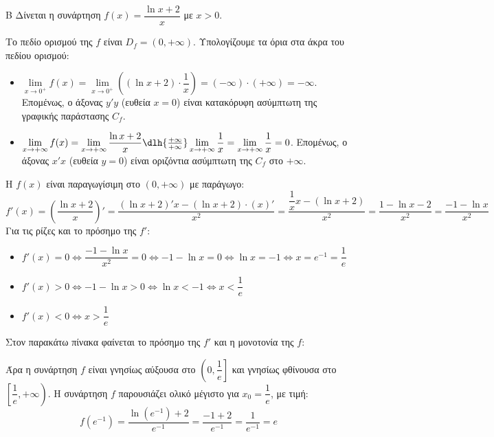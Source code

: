 \begin{thema}{Β}
Δίνεται η συνάρτηση $f(x) = \dfrac{\ln x + 2}{x}$ με $x > 0$.

\begin{erwthma}
\item Το πεδίο ορισμού της $f$ είναι $D_f = (0, +\infty)$.
Υπολογίζουμε τα όρια στα άκρα του πεδίου ορισμού:
\begin{itemize}
\item $\lim\limits_{x\to0^+} f(x) = \lim\limits_{x\to0^+} \left( (\ln x + 2) \cdot \dfrac{1}{x} \right) = (-\infty) \cdot (+\infty) = -\infty$.
  Επομένως, ο άξονας $y'y$ (ευθεία $x=0$) είναι κατακόρυφη ασύμπτωτη της γραφικής παράστασης $C_f$.
\item $\lim\limits_{x\to+\infty} f(x) = \lim\limits_{x\to+\infty} \dfrac{\ln x + 2}{x} \dlh{\frac{+\infty}{+\infty}} \lim\limits_{x\to+\infty} \dfrac{1}{x} = \lim\limits_{x\to+\infty} \dfrac{1}{x} = 0$.
Επομένως, ο άξονας $x'x$ (ευθεία $y=0$) είναι οριζόντια ασύμπτωτη της $C_f$ στο $+\infty$.
\end{itemize}


\item Η $f(x)$ είναι παραγωγίσιμη στο $(0, +\infty)$ με παράγωγο:
\[ f'(x) = \left( \dfrac{\ln x + 2}{x} \right)' = \dfrac{(\ln x + 2)' x - (\ln x + 2) \cdot (x)'}{x^2} = \dfrac{\dfrac{1}{x}x - (\ln x + 2)}{x^2} = \dfrac{1 - \ln x - 2}{x^2} = \dfrac{-1 - \ln x}{x^2} \]
Για τις ρίζες και το πρόσημο της $f'$:
\begin{itemize}
    \item $f'(x) = 0 \Leftrightarrow \dfrac{-1-\ln x}{x^2} = 0 \Leftrightarrow -1-\ln x = 0 \Leftrightarrow \ln x = -1 \Leftrightarrow x = e^{-1} = \dfrac{1}{e}$
    \item $f'(x) > 0 \Leftrightarrow -1-\ln x > 0 \Leftrightarrow \ln x < -1 \Leftrightarrow x < \dfrac{1}{e}$
    \item $f'(x) < 0 \Leftrightarrow x > \dfrac{1}{e}$
\end{itemize}
Στον παρακάτω πίνακα φαίνεται το πρόσημο της $f'$ και η μονοτονία της $f$:
\begin{center}
\end{center}
Άρα η συνάρτηση $f$ είναι γνησίως αύξουσα στο $\left(0, \dfrac{1}{e}\right]$ και γνησίως φθίνουσα στο $\left[\dfrac{1}{e}, +\infty\right)$.
Η συνάρτηση $f$ παρουσιάζει ολικό μέγιστο για $x_0 = \dfrac{1}{e}$, με τιμή:
\[ f(e^{-1}) = \dfrac{\ln(e^{-1}) + 2}{e^{-1}} = \dfrac{-1+2}{e^{-1}} = \dfrac{1}{e^{-1}} = e \]


\end{erwthma}
\end{thema}

